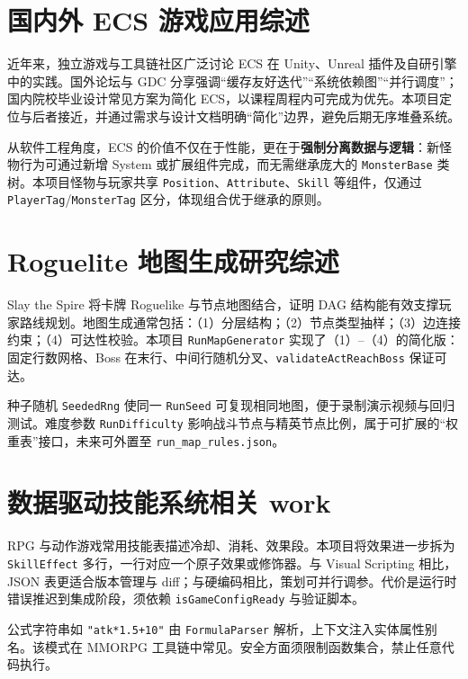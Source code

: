 ﻿
\section{国内外 ECS 游戏应用综述}

近年来，独立游戏与工具链社区广泛讨论 ECS 在 Unity、Unreal 插件及自研引擎中的实践\cite{gregory2018game}。国外论坛与 GDC 分享强调“缓存友好迭代”“系统依赖图”“并行调度”；国内院校毕业设计常见方案为简化 ECS，以课程周程内可完成为优先。本项目定位与后者接近，并通过需求与设计文档明确“简化”边界，避免后期无序堆叠系统。

从软件工程角度，ECS 的价值不仅在于性能，更在于\textbf{强制分离数据与逻辑}：新怪物行为可通过新增 System 或扩展组件完成，而无需继承庞大的 \texttt{MonsterBase} 类树。本项目怪物与玩家共享 \texttt{Position}、\texttt{Attribute}、\texttt{Skill} 等组件，仅通过 \texttt{PlayerTag}/\texttt{MonsterTag} 区分，体现组合优于继承的原则。

\section{Roguelite 地图生成研究综述}

Slay the Spire 将卡牌 Roguelike 与节点地图结合，证明 DAG 结构能有效支撑玩家路线规划\cite{gregory2018game}。地图生成通常包括：（1）分层结构；（2）节点类型抽样；（3）边连接约束；（4）可达性校验。本项目 \texttt{RunMapGenerator} 实现了（1）--（4）的简化版：固定行数网格、Boss 在末行、中间行随机分叉、\texttt{validateActReachBoss} 保证可达。

种子随机 \texttt{SeededRng} 使同一 \texttt{RunSeed} 可复现相同地图，便于录制演示视频与回归测试\cite{gregory2018game}。难度参数 \texttt{RunDifficulty} 影响战斗节点与精英节点比例，属于可扩展的“权重表”接口，未来可外置至 \texttt{run\_map\_rules.json}。

\section{数据驱动技能系统相关 work}

RPG 与动作游戏常用技能表描述冷却、消耗、效果段。本项目将效果进一步拆为 \texttt{SkillEffect} 多行，一行对应一个原子效果或修饰器\cite{gregory2018game,gregory2018game}。与 Visual Scripting 相比，JSON 表更适合版本管理与 diff；与硬编码相比，策划可并行调参。代价是运行时错误推迟到集成阶段，须依赖 \texttt{isGameConfigReady} 与验证脚本。

公式字符串如 \texttt{"atk*1.5+10"} 由 \texttt{FormulaParser} 解析，上下文注入实体属性别名。该模式在 MMORPG 工具链中常见\cite{gregory2018game}。安全方面须限制函数集合，禁止任意代码执行。

